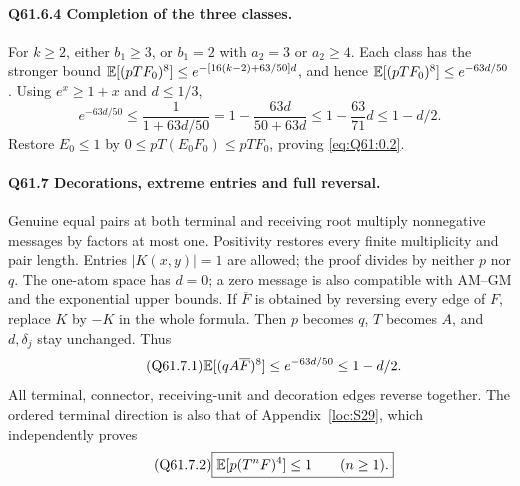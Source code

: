 \paragraph{Q61.6.4 Completion of the three classes.}
For \(k\ge\allowbreak 2\), either \(b_1\ge\allowbreak 3\), or \(b_1=\allowbreak 2\) with \(a_2=\allowbreak 3\)
or \(a_2\ge\allowbreak 4\). Each class has the stronger bound
\(\mathbb E[(pTF_0)^8]\le\allowbreak  e^{-[16(k-2)+63/50]d}\), and hence
\(\mathbb E[(pTF_0)^8]\le\allowbreak  e^{-63d/50}\).
Using \(e^x\ge\allowbreak 1+x\) and \(d\le\allowbreak 1/3\),
\begin{equation}\tag{Q61.6.9}\label{eq:Q61:6.9}
e^{-63d/50}\le\frac1{1+63d/50}
=1-\frac{63d}{50+63d}\le1-\frac{63}{71}d\le1-d/2.
\end{equation}
Restore \(E_0\le\allowbreak 1\) by
\(0\le\allowbreak  pT(E_0F_0)\le\allowbreak  pTF_0\), proving \eqref{eq:Q61:0.2}.

\paragraph{Q61.7 Decorations, extreme entries and full reversal.}
Genuine equal pairs at both terminal and receiving root multiply
nonnegative messages by factors at most one. Positivity restores
every finite multiplicity and pair length. Entries \(|K(x,\allowbreak y)|=\allowbreak 1\)
are allowed; the proof divides by neither \(p\) nor \(q\).
The one-atom space has \(d=\allowbreak 0\); a zero message is also compatible
with AM--GM and the exponential upper bounds.
If \(\overline F\) is obtained by reversing every edge of \(F\),
replace \(K\) by \(-K\) in the whole formula. Then \(p\) becomes
\(q\), \(T\) becomes \(A\), and \(d,\allowbreak \delta_j\) stay unchanged. Thus
\begin{equation}\tag{Q61.7.1}\label{eq:Q61:7.1}
\mathbb E[(qA\overline F)^8]\le e^{-63d/50}\le1-d/2.
\end{equation}
All terminal, connector, receiving-unit and decoration edges reverse
together. The ordered terminal direction is also that of
Appendix~\ref{loc:S29}, which independently proves
\begin{equation}\tag{Q61.7.2}\label{eq:Q61:7.2}
\boxed{\mathbb E[p(T^nF)^4]\le1\qquad(n\ge1).}
\end{equation}
